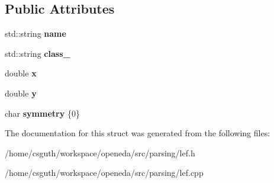 \subsection*{Public Attributes}
\begin{DoxyCompactItemize}
\item 
\hypertarget{structophidian_1_1parsing_1_1lef_1_1site_a721a1ac17244c290f98112d16beaa489}{std\-::string {\bfseries name}}\label{structophidian_1_1parsing_1_1lef_1_1site_a721a1ac17244c290f98112d16beaa489}

\item 
\hypertarget{structophidian_1_1parsing_1_1lef_1_1site_a8e1f67acac904fc6e12f8b2b4b341ab5}{std\-::string {\bfseries class\-\_\-}}\label{structophidian_1_1parsing_1_1lef_1_1site_a8e1f67acac904fc6e12f8b2b4b341ab5}

\item 
\hypertarget{structophidian_1_1parsing_1_1lef_1_1site_a46bef22e48f51b7808157419927e696a}{double {\bfseries x}}\label{structophidian_1_1parsing_1_1lef_1_1site_a46bef22e48f51b7808157419927e696a}

\item 
\hypertarget{structophidian_1_1parsing_1_1lef_1_1site_aeae19db4642243b6c7a1aab745bb1803}{double {\bfseries y}}\label{structophidian_1_1parsing_1_1lef_1_1site_aeae19db4642243b6c7a1aab745bb1803}

\item 
\hypertarget{structophidian_1_1parsing_1_1lef_1_1site_a06d220a2d91948084df81edae459f4d5}{char {\bfseries symmetry} \{0\}}\label{structophidian_1_1parsing_1_1lef_1_1site_a06d220a2d91948084df81edae459f4d5}

\end{DoxyCompactItemize}


The documentation for this struct was generated from the following files\-:\begin{DoxyCompactItemize}
\item 
/home/csguth/workspace/openeda/src/parsing/lef.\-h\item 
/home/csguth/workspace/openeda/src/parsing/lef.\-cpp\end{DoxyCompactItemize}
